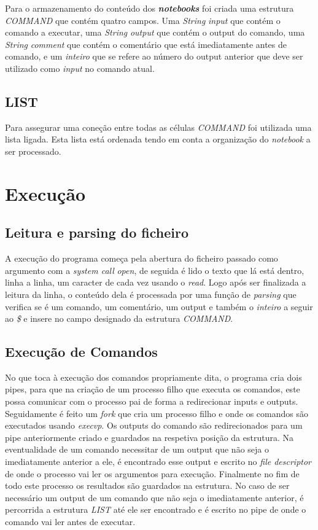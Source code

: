 Para o armazenamento do conteúdo dos \textbf{\textit{notebooks}} foi criada uma estrutura \textit{COMMAND} que contém quatro campos. Uma \textit{String} \textit{\textit{input}} que contém o comando a executar, uma \textit{String} \textit{\textit{output}} que contém o output do comando, uma \textit{String} \textit{\textit{comment}} que contém o comentário que está imediatamente antes de comando, e um \textit{inteiro} que se refere ao número do output anterior que deve ser utilizado como \textit{input} no comando atual. 

\subsection{LIST}

Para assegurar uma coneção entre todas as células \textit{COMMAND} foi utilizada uma lista ligada. Esta lista está ordenada tendo em conta a organização do \textit{\textit{notebook}} a ser processado.


\section{Execução}

\subsection{Leitura e parsing do ficheiro}
A execução do programa começa pela abertura do ficheiro passado como argumento com a \textit{system call} \textit{\textit{open}}, de seguida é lido o texto que lá está dentro, linha a linha, um caracter de cada vez usando o \textit{\textit{read}}. Logo após ser finalizada a leitura da linha, o conteúdo dela é processada por uma função de \textit{parsing} que verifica se é um comando, um comentário, um  output e também o \textit{inteiro} a seguir ao \textit{\$} e insere no campo designado da estrutura \textit{COMMAND}.

\subsection{Execução de Comandos}
No que toca à execução dos comandos propriamente dita, o programa cria dois pipes, para que na criação de um processo filho que executa os comandos, este possa comunicar com o processo pai de forma a redirecionar inputs e outputs. Seguidamente é feito um \textit{\textit{fork}} que cria um processo filho e onde os comandos são executados usando \textit{\textit{execvp}}. Os outputs do comando são redirecionados para um pipe anteriormente criado e guardados na respetiva posição da estrutura. Na eventualidade de um comando necessitar de um output que não seja o imediatamente anterior a ele, é encontrado esse output e escrito no \textit{file descriptor} de onde o processo vai ler os argumentos para execução. Finalmente no fim de todo este processo os resultados são guardados na estrutura. No caso de ser necessário um output de um comando que não seja o imediatamente anterior, é percorrida a estrutura \textit{LIST} até ele ser encontrado e é escrito no pipe de onde o comando vai ler antes de executar.


